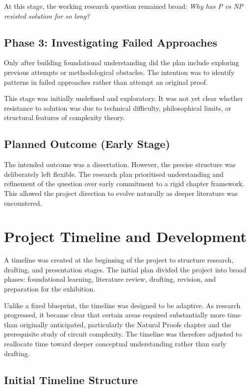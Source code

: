 \documentclass[12pt]{article}
\begin{document}
At this stage, the working research question remained broad: 
\textit{Why has P vs NP resisted solution for so long?}

\subsection*{Phase 3: Investigating Failed Approaches}

Only after building foundational understanding did the plan include exploring previous attempts or methodological obstacles.
The intention was to identify patterns in failed approaches rather than attempt an original proof.

This stage was initially undefined and exploratory.
It was not yet clear whether resistance to solution was due to technical difficulty, philosophical limits, or structural features of complexity theory.

\subsection*{Planned Outcome (Early Stage)}

The intended outcome was a dissertation.
However, the precise structure was deliberately left flexible.
The research plan prioritised understanding and refinement of the question over early commitment to a rigid chapter framework.
This allowed the project direction to evolve naturally as deeper literature was encountered.

\section{Project Timeline and Development}

A timeline was created at the beginning of the project to structure research, drafting, and presentation stages.
The initial plan divided the project into broad phases: foundational learning, literature review, drafting, revision, and preparation for the exhibition.

Unlike a fixed blueprint, the timeline was designed to be adaptive.
As research progressed, it became clear that certain areas required substantially more time than originally anticipated, particularly the Natural Proofs chapter and the prerequisite study of circuit complexity.
The timeline was therefore adjusted to reallocate time toward deeper conceptual understanding rather than early drafting.

\subsection*{Initial Timeline Structure}
\end{document}
